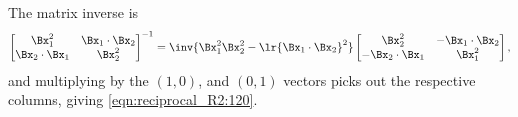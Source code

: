 {The matrix inverse is
\begin{equation}\label{eqn:2dreciprocalMatrixCalculation:240}
{
\begin{bmatrix}
\Bx_1^2 & \Bx_1 \cdot \Bx_2 \\
\Bx_2 \cdot \Bx_1 & \Bx_2^2 \\
\end{bmatrix}
}^{-1}
=
\inv{ \Bx_1^2 \Bx_2^2 - \lr{\Bx_1 \cdot \Bx_2}^2 }
\begin{bmatrix}
\Bx_2^2 & -\Bx_1 \cdot \Bx_2 \\
-\Bx_2 \cdot \Bx_1 & \Bx_1^2 \\
\end{bmatrix},
\end{equation}
and multiplying by the \( (1,0) \), and \( (0,1) \) vectors picks out the respective columns, giving \cref{eqn:reciprocal_R2:120}.
} %
